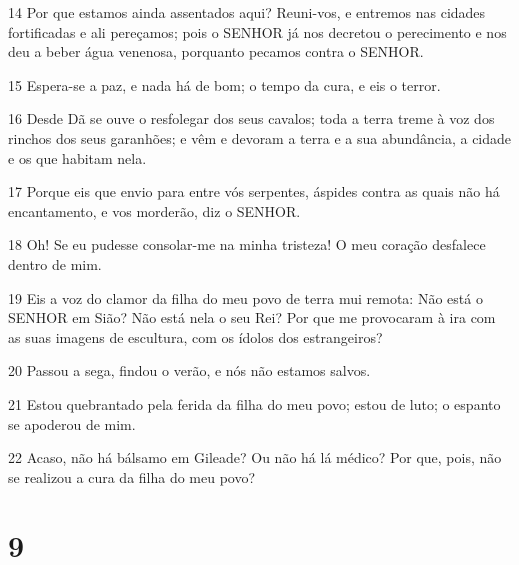 \par 14 Por que estamos ainda assentados aqui? Reuni-vos, e entremos nas cidades fortificadas e ali pereçamos; pois o SENHOR já nos decretou o perecimento e nos deu a beber água venenosa, porquanto pecamos contra o SENHOR.
\par 15 Espera-se a paz, e nada há de bom; o tempo da cura, e eis o terror.
\par 16 Desde Dã se ouve o resfolegar dos seus cavalos; toda a terra treme à voz dos rinchos dos seus garanhões; e vêm e devoram a terra e a sua abundância, a cidade e os que habitam nela.
\par 17 Porque eis que envio para entre vós serpentes, áspides contra as quais não há encantamento, e vos morderão, diz o SENHOR.
\par 18 Oh! Se eu pudesse consolar-me na minha tristeza! O meu coração desfalece dentro de mim.
\par 19 Eis a voz do clamor da filha do meu povo de terra mui remota: Não está o SENHOR em Sião? Não está nela o seu Rei? Por que me provocaram à ira com as suas imagens de escultura, com os ídolos dos estrangeiros?
\par 20 Passou a sega, findou o verão, e nós não estamos salvos.
\par 21 Estou quebrantado pela ferida da filha do meu povo; estou de luto; o espanto se apoderou de mim.
\par 22 Acaso, não há bálsamo em Gileade? Ou não há lá médico? Por que, pois, não se realizou a cura da filha do meu povo?

\chapter{9}

